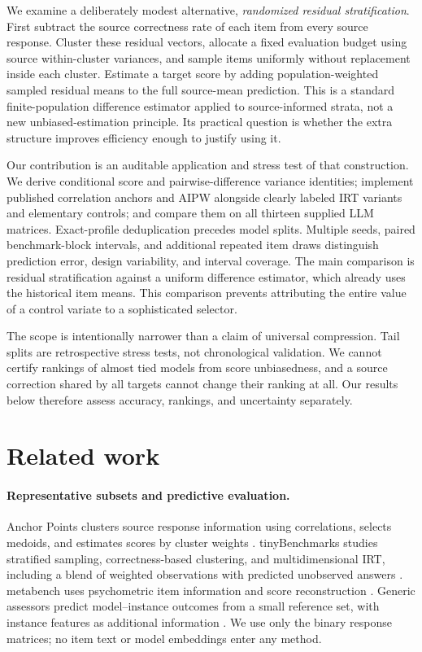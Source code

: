 \documentclass{article}
\begin{document}
We examine a deliberately modest alternative, \emph{randomized residual stratification}. First subtract the source correctness rate of each item from every source response. Cluster these residual vectors, allocate a fixed evaluation budget using source within-cluster variances, and sample items uniformly without replacement inside each cluster. Estimate a target score by adding population-weighted sampled residual means to the full source-mean prediction. This is a standard finite-population difference estimator applied to source-informed strata, not a new unbiased-estimation principle. Its practical question is whether the extra structure improves efficiency enough to justify using it.

Our contribution is an auditable application and stress test of that construction. We derive conditional score and pairwise-difference variance identities; implement published correlation anchors and AIPW alongside clearly labeled IRT variants and elementary controls; and compare them on all thirteen supplied LLM matrices. Exact-profile deduplication precedes model splits. Multiple seeds, paired benchmark-block intervals, and additional repeated item draws distinguish prediction error, design variability, and interval coverage. The main comparison is residual stratification against a uniform difference estimator, which already uses the historical item means. This comparison prevents attributing the entire value of a control variate to a sophisticated selector.

The scope is intentionally narrower than a claim of universal compression. Tail splits are retrospective stress tests, not chronological validation. We cannot certify rankings of almost tied models from score unbiasedness, and a source correction shared by all targets cannot change their ranking at all. Our results below therefore assess accuracy, rankings, and uncertainty separately.

\section{Related work}
\paragraph{Representative subsets and predictive evaluation.}
Anchor Points clusters source response information using correlations, selects medoids, and estimates scores by cluster weights \citep{vivek2024}. tinyBenchmarks studies stratified sampling, correctness-based clustering, and multidimensional IRT, including a blend of weighted observations with predicted unobserved answers \citep{polo2024}. metabench uses psychometric item information and score reconstruction \citep{kipnis2025}. Generic assessors predict model--instance outcomes from a small reference set, with instance features as additional information \citep{pacchiardi2024}. We use only the binary response matrices; no item text or model embeddings enter any method.
\end{document}
